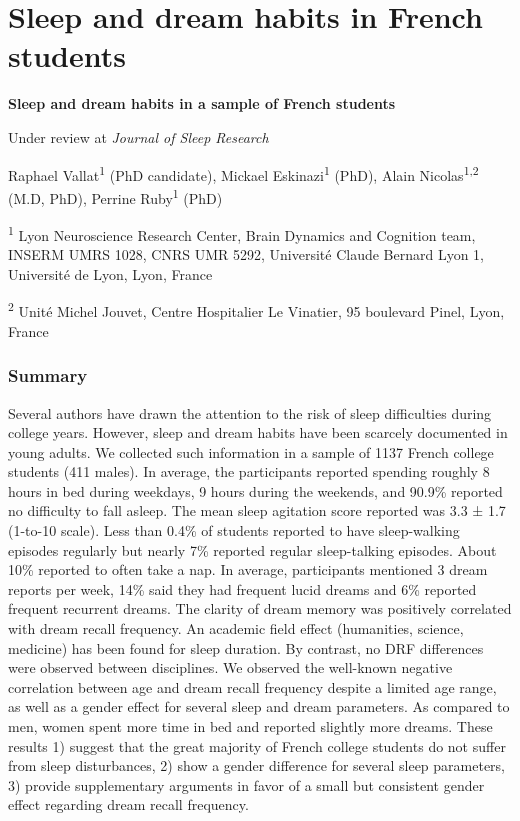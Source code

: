 \cleardoublepage

\chapter{Sleep and dream habits in French students}
\label{res:survey}

\textbf{{\large Sleep and dream habits in a sample of French students}}

\hfill Under review at \emph{Journal of Sleep Research}

\bigskip

Raphael Vallat\textsuperscript{1} (PhD candidate), Mickael Eskinazi\textsuperscript{1} (PhD), Alain Nicolas\textsuperscript{1,2} (M.D, PhD), Perrine Ruby\textsuperscript{1} (PhD)

\textsuperscript{1} Lyon Neuroscience Research Center, Brain Dynamics and Cognition team, INSERM UMRS 1028, CNRS UMR 5292, Université Claude Bernard Lyon 1, Université de Lyon, Lyon, France

\textsuperscript{2} Unité Michel Jouvet, Centre Hospitalier Le Vinatier, 95 boulevard Pinel, Lyon, France

\subsection*{Summary}
\label{res:survey:summary}

Several authors have drawn the attention to the risk of sleep difficulties during college years. However, sleep and dream habits have been scarcely documented in young adults. We collected such information in a sample of 1137 French college students (411 males). In average, the participants reported spending roughly 8 hours in bed during weekdays, 9 hours during the weekends, and 90.9\% reported no difficulty to fall asleep. The mean sleep agitation score reported was 3.3 ± 1.7 (1-to-10 scale). Less than 0.4\% of students reported to have sleep-walking episodes regularly but nearly 7\% reported regular sleep-talking episodes. About 10\% reported to often take a nap. In average, participants mentioned 3 dream reports per week, 14\% said they had frequent lucid dreams and 6\% reported frequent recurrent dreams. The clarity of dream memory was positively correlated with dream recall frequency. An academic field effect (humanities, science, medicine) has been found for sleep duration. By contrast, no DRF differences were observed between disciplines. We observed the well-known negative correlation between age and dream recall frequency despite a limited age range, as well as a gender effect for several sleep and dream parameters. As compared to men, women spent more time in bed and reported slightly more dreams. These results 1) suggest that the great majority of French college students do not suffer from sleep disturbances, 2) show a gender difference for several sleep parameters, 3) provide supplementary arguments in favor of a small but consistent gender effect regarding dream recall frequency.


